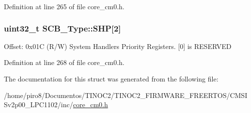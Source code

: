 Definition at line 265 of file core\+\_\+cm0.\+h.

\subsubsection[{\texorpdfstring{S\+HP}{SHP}}]{ uint32\+\_\+t S\+C\+B\+\_\+\+Type\+::\+S\+HP\mbox{[}2\mbox{]}}\hypertarget{struct_s_c_b___type_a2eeb91c03a8ec3a4c50737bac62d4fc9}{}\label{struct_s_c_b___type_a2eeb91c03a8ec3a4c50737bac62d4fc9}
Offset\+: 0x01C (R/W) System Handlers Priority Registers. \mbox{[}0\mbox{]} is R\+E\+S\+E\+R\+V\+ED 

Definition at line 268 of file core\+\_\+cm0.\+h.



The documentation for this struct was generated from the following file\+:\begin{DoxyCompactItemize}
\item 
/home/piro8/\+Documentos/\+T\+I\+N\+O\+C2/\+T\+I\+N\+O\+C2\+\_\+\+F\+I\+R\+M\+W\+A\+R\+E\+\_\+\+F\+R\+E\+E\+R\+T\+O\+S/\+C\+M\+S\+I\+Sv2p00\+\_\+\+L\+P\+C1102/inc/\hyperlink{core__cm0_8h}{core\+\_\+cm0.\+h}\end{DoxyCompactItemize}
